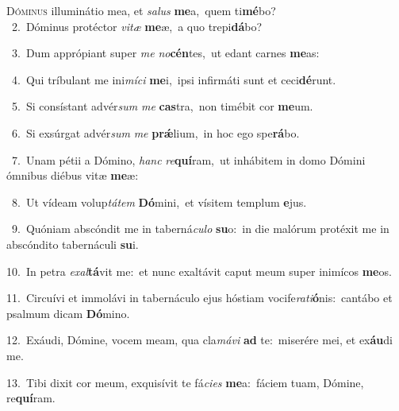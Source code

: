 \lettrine{\initial\textcolor{\initialcolor}{D}}{óminus} illuminátio mea, et \textit{sa}\-\textit{lus} \textbf{me}\-a,~\star quem ti\-\textbf{mé}\-bo?\\
{\numbfont\textcolor{\numbcolor}{~2.}}~Dóminus protéctor \textit{vi}\-\textit{tæ} \textbf{me}\-æ,~\star a quo trepi\-\textbf{dá}\-bo?\par
{\numbfont\textcolor{\numbcolor}{~3.}}~Dum apprópiant super \textit{me} \textit{no}\-\textbf{cén}tes,~\star ut edant carnes \textbf{me}\-as:\par
{\numbfont\textcolor{\numbcolor}{~4.}}~Qui tríbulant me ini\-\textit{mí}\-\textit{ci} \textbf{me}\-i,~\star ipsi infirmáti sunt et ceci\-\textbf{dé}\-runt.\par
{\numbfont\textcolor{\numbcolor}{~5.}}~Si consístant advér\textit{sum} \textit{me} \textbf{cas}\-tra,~\star non timébit cor \textbf{me}\-um.\par
{\numbfont\textcolor{\numbcolor}{~6.}}~Si exsúrgat advér\textit{sum} \textit{me} \textbf{prǽ}\-lium,~\star in hoc ego spe\-\textbf{rá}\-bo.\par
{\numbfont\textcolor{\numbcolor}{~7.}}~Unam pétii a Dómino, \textit{hanc} \textit{re}\-\textbf{quí}ram,~\star ut inhábitem in domo Dómini ómnibus diébus vitæ \textbf{me}\-æ:\par
{\numbfont\textcolor{\numbcolor}{~8.}}~Ut vídeam volup\-\textit{tá}\-\textit{tem} \textbf{Dó}\-mini,~\star et vísitem templum \textbf{e}\-jus.\par
{\numbfont\textcolor{\numbcolor}{~9.}}~Quóniam abscóndit me in taberná\-\textit{cu}\-\textit{lo} \textbf{su}\-o:~\star in die malórum protéxit me in abscóndito tabernáculi \textbf{su}\-i.\par
{\numbfont\textcolor{\numbcolor}{10.}}~In petra \textit{ex}\-\textit{al}\textbf{tá}vit me:~\star et nunc exaltávit caput meum super inimícos \textbf{me}\-os.\par
{\numbfont\textcolor{\numbcolor}{11.}}~Circuívi et immolávi in tabernáculo ejus hóstiam vocife\-\textit{ra}\-\textit{ti}\textbf{ó}nis:~\star cantábo et psalmum dicam \textbf{Dó}\-mino.\par
{\numbfont\textcolor{\numbcolor}{12.}}~Exáudi, Dómine, vocem meam, qua cla\-\textit{má}\-\textit{vi} \textbf{ad} te:~\star miserére mei, et ex\-\textbf{áu}\-di me.\par
{\numbfont\textcolor{\numbcolor}{13.}}~Tibi dixit cor meum, exquisívit te fá\-\textit{ci}\-\textit{es} \textbf{me}\-a:~\star fáciem tuam, Dómine, re\-\textbf{quí}\-ram.\par
